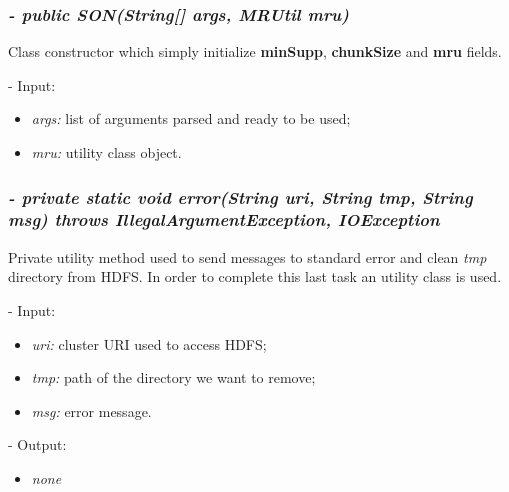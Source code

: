\documentclass[]{report}
\begin{document}
	\subsubsection*{\textit{\textbf{-} public SON(String[] args, MRUtil mru)}}
		Class constructor which simply initialize \textbf{minSupp}, \textbf{chunkSize} and \textbf{mru} fields.  
	\begin{description}
		\item - Input:
		\begin{itemize}
			\item \textit{args:} list of arguments parsed and ready to be used;
			\item \textit{mru:} utility class object.
		\end{itemize}
	\end{description}
   
	\subsubsection*{\textit{\textbf{-} private static void error(String uri, String tmp, String msg) throws IllegalArgumentException, IOException}}
	Private utility method used to send messages to standard error and clean \textit{tmp} directory from HDFS. In order to complete this last task an utility class is used.  
	\begin{description}
		\item - Input:
		\begin{itemize}
			\item \textit{uri:} cluster URI used to access HDFS;
			\item \textit{tmp:} path of the directory we want to remove;
			\item \textit{msg:} error message.
		\end{itemize}
	\end{description}
	\begin{description}
		\item - Output:
		\begin{itemize}
			\item \textit{none} 
		\end{itemize}
	\end{description}	
	 
\end{document}

